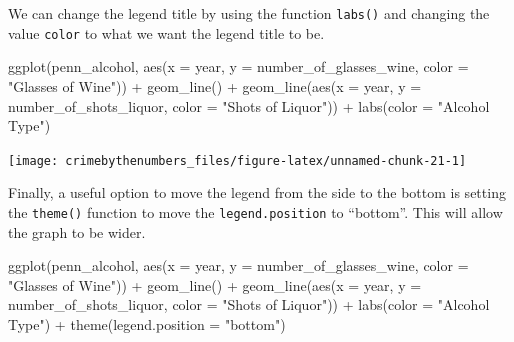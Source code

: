 \documentclass[
  12pt,
]{book}
\newenvironment{Shaded}{\begin{snugshade}}{\end{snugshade}}
\newcommand{\AttributeTok}[1]{\textcolor[rgb]{0.61,0.61,0.61}{#1}}
\newcommand{\FunctionTok}[1]{\textcolor[rgb]{0,0,0}{#1}}
\newcommand{\NormalTok}[1]{#1}
\newcommand{\SpecialCharTok}[1]{\textcolor[rgb]{0,0,0}{#1}}
\newcommand{\StringTok}[1]{\textcolor[rgb]{0.5,0.5,0.5}{#1}}
\begin{document}
We can change the legend title by using the function \texttt{labs()} and changing the value \texttt{color} to what we want the legend title to be.

\begin{Shaded}
\begin{Highlighting}[]
\FunctionTok{ggplot}\NormalTok{(penn\_alcohol, }\FunctionTok{aes}\NormalTok{(}\AttributeTok{x =}\NormalTok{ year, }\AttributeTok{y =}\NormalTok{ number\_of\_glasses\_wine,}
                         \AttributeTok{color =} \StringTok{"Glasses of Wine"}\NormalTok{)) }\SpecialCharTok{+}
  \FunctionTok{geom\_line}\NormalTok{() }\SpecialCharTok{+}
  \FunctionTok{geom\_line}\NormalTok{(}\FunctionTok{aes}\NormalTok{(}\AttributeTok{x =}\NormalTok{ year, }\AttributeTok{y =}\NormalTok{ number\_of\_shots\_liquor,}
                \AttributeTok{color =} \StringTok{"Shots of Liquor"}\NormalTok{)) }\SpecialCharTok{+}
  \FunctionTok{labs}\NormalTok{(}\AttributeTok{color =} \StringTok{"Alcohol Type"}\NormalTok{)}
\end{Highlighting}
\end{Shaded}

\begin{center}\texttt{[image: crimebythenumbers\_files/figure-latex/unnamed-chunk-21-1]} \end{center}

Finally, a useful option to move the legend from the side to the bottom is setting the \texttt{theme()} function to move the \texttt{legend.position} to ``bottom''. This will allow the graph to be wider.

\begin{Shaded}
\begin{Highlighting}[]
\FunctionTok{ggplot}\NormalTok{(penn\_alcohol, }\FunctionTok{aes}\NormalTok{(}\AttributeTok{x =}\NormalTok{ year, }\AttributeTok{y =}\NormalTok{ number\_of\_glasses\_wine,}
                         \AttributeTok{color =} \StringTok{"Glasses of Wine"}\NormalTok{)) }\SpecialCharTok{+}
  \FunctionTok{geom\_line}\NormalTok{() }\SpecialCharTok{+}
  \FunctionTok{geom\_line}\NormalTok{(}\FunctionTok{aes}\NormalTok{(}\AttributeTok{x =}\NormalTok{ year, }\AttributeTok{y =}\NormalTok{ number\_of\_shots\_liquor,}
                \AttributeTok{color =} \StringTok{"Shots of Liquor"}\NormalTok{)) }\SpecialCharTok{+}
  \FunctionTok{labs}\NormalTok{(}\AttributeTok{color =} \StringTok{"Alcohol Type"}\NormalTok{) }\SpecialCharTok{+}
  \FunctionTok{theme}\NormalTok{(}\AttributeTok{legend.position =} \StringTok{"bottom"}\NormalTok{)}
\end{Highlighting}
\end{Shaded}
\end{document}
